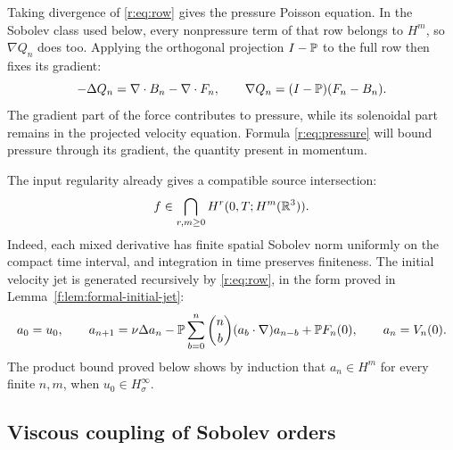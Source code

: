 Taking divergence of \eqref{r:eq:row} gives the pressure Poisson equation.
In the Sobolev class used below, every nonpressure term of that row belongs
to \(H^m\), so \(\nabla Q_n\) does too. Applying the orthogonal
projection \(I-\mathbb P\) to the full row then fixes its gradient:
\begin{equation}
 -\Delta Q_n=\nabla\cdot B_n-\nabla\cdot F_n,
 \qquad \nabla Q_n=(I-\mathbb P)(F_n-B_n).
 \label{r:eq:pressure}
\end{equation}
The gradient part of the force contributes to pressure, while its solenoidal
part remains in the projected velocity equation. Formula \eqref{r:eq:pressure}
will bound pressure through its gradient, the quantity present in momentum.


The input regularity already gives a compatible source intersection:
\begin{equation}
 f\in\bigcap_{r,m\ge0}H^r(0,T;H^m(\mathbb R^3)).
 \label{r:eq:force-intersection}
\end{equation}
Indeed, each mixed derivative has finite spatial Sobolev norm uniformly on the
compact time interval, and integration in time preserves finiteness. The
initial velocity jet is generated recursively by \eqref{r:eq:row}, in the
form proved in Lemma~\ref{f:lem:formal-initial-jet}:
\begin{equation}
 a_0=u_0,\qquad
 a_{n+1}=\nu\Delta a_n
 -\mathbb P\sum_{b=0}^n\binom nb(a_b\cdot\nabla)a_{n-b}
 +\mathbb P F_n(0),\qquad a_n=V_n(0).
 \label{r:eq:initial}
\end{equation}
The product bound proved below shows by induction that \(a_n\in H^m\)
for every finite \(n,m\), when \(u_0\in H^\infty_\sigma\).

\subsection{Viscous coupling of Sobolev orders}


